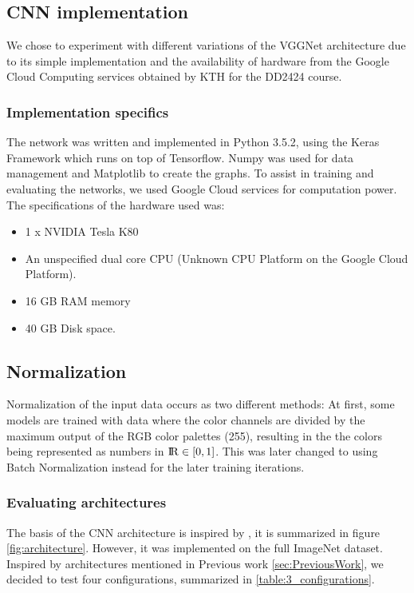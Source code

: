 \documentclass{kthreport}
\begin{document}
\subsection{CNN implementation}

We chose to experiment with different variations of the VGGNet architecture due to its simple implementation and the availability of hardware from the Google Cloud Computing services obtained by KTH for the DD2424 course.

\subsubsection{Implementation specifics}

The network was written and implemented in Python 3.5.2, using the Keras Framework which runs on top of Tensorflow. Numpy was used for data management and Matplotlib to create the graphs. To assist in training and evaluating the networks, we used Google Cloud services for computation power. The specifications of the hardware used was:

\begin{itemize}
  \item 1 x NVIDIA Tesla K80
  \item An unspecified dual core CPU (Unknown CPU Platform on the Google Cloud Platform).
  \item 16 GB RAM memory
  \item 40 GB Disk space.
\end{itemize}

\subsection{Normalization}
Normalization of the input data occurs as two different methods: At first, some models are trained with data where the color channels are divided by the maximum output of the RGB color palettes (255), resulting in the the colors being represented as numbers in ${\rm I\!R} \in [0,1]$.
This was later changed to using Batch Normalization instead for the later training iterations.

\subsubsection{Evaluating architectures}

The basis of the CNN architecture is inspired by \cite{NIPS2012_4824}, it is summarized in figure \ref{fig:architecture}. However, it was implemented on the full ImageNet dataset. Inspired by architectures mentioned in Previous work \ref{sec:PreviousWork}, we decided to test four configurations, summarized in \ref{table:3_configurations}.
\end{document}
